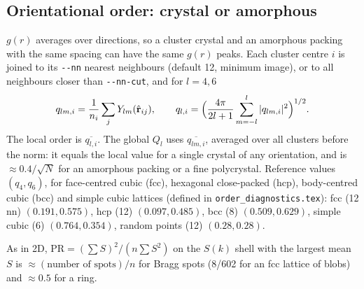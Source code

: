 \documentclass[11pt]{article}
\newcommand{\code}[1]{\texttt{#1}}
\begin{document}
\subsection{Orientational order: crystal or amorphous}
$g(r)$ averages over directions, so a cluster crystal and an amorphous packing
with the same spacing can have the same $g(r)$ peaks. Each cluster centre $i$
is joined to its \code{-{}-nn} nearest neighbours (default 12, minimum image),
or to all neighbours closer than \code{-{}-nn-cut}, and for $l=4,6$
\begin{equation}
  q_{lm,i} = \frac1{n_i}\sum_j Y_{lm}(\hat{\mathbf r}_{ij}) ,\qquad
  q_{l,i} = \Bigl(\frac{4\pi}{2l+1}\sum_{m=-l}^{l}|q_{lm,i}|^2\Bigr)^{1/2} .
\end{equation}
The local order is $\overline{q_{l,i}}$. The global $Q_l$ uses
$\overline{q_{lm,i}}$, averaged over all clusters before the norm: it equals
the local value for a single crystal of any orientation, and is
$\approx0.4/\sqrt N$ for an amorphous packing or a fine polycrystal. Reference
values $(q_4, q_6)$, for face-centred cubic (fcc), hexagonal close-packed
(hcp), body-centred cubic (bcc) and simple cubic lattices (defined in
\code{order\_diagnostics.tex}): fcc (12 nn) $(0.191, 0.575)$, hcp (12) $(0.097, 0.485)$,
bcc (8) $(0.509, 0.629)$, simple cubic (6) $(0.764, 0.354)$, random points (12)
$(0.28, 0.28)$.

As in 2D, $\mathrm{PR}=(\sum S)^2/(n\sum S^2)$ on the $S(k)$ shell with the
largest mean $S$ is $\approx(\text{number of spots})/n$ for Bragg spots (8/602
for an fcc lattice of blobs) and $\approx0.5$ for a ring.
\end{document}
